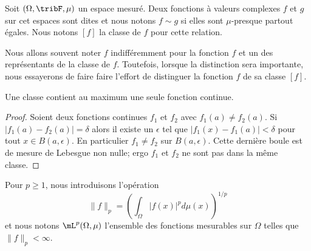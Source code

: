 \begin{definition}      \label{DEFooKMJQooXeaUtp}
	Soit \( (\Omega,\tribF,\mu)\) un espace mesuré. Deux fonctions à valeurs complexes \( f\) et \( g\) sur cet espaces sont dites  et nous notons \( f\sim g\) si elles sont \( \mu\)-presque partout égales. Nous notons \( [f]\) la classe de \( f\) pour cette relation.
\end{definition}

Nous allons souvent noter \( f\) indifféremment pour la fonction \( f\) et un des représentants de la classe de \( f\). Toutefois, lorsque la distinction sera importante, nous essayerons de faire faire l'effort de distinguer la fonction \( f\) de sa classe \( [f]\).

\begin{lemma}
	Une classe contient au maximum une seule fonction continue.
\end{lemma}

\begin{proof}
	Soient deux fonctions continues \( f_1\) et \( f_2\) avec \( f_1(a)\neq f_2(a)\). Si \( | f_1(a)-f_2(a) |=\delta\) alors il existe un \( \epsilon\) tel que \( | f_1(x)-f_1(a) |<\delta\) pour tout \( x\in B(a,\epsilon)\). En particulier \( f_1\neq f_2\) sur \( B(a,\epsilon)\). Cette dernière boule est de mesure de Lebesgue non nulle; ergo \( f_1\) et \( f_2\) ne sont pas dans la même classe.
\end{proof}

\begin{definition}      \label{DEFooTHIDooWYzBtn}
	Pour \( p\geq 1\), nous introduisons l'opération
	\begin{equation}        \label{EQooBDBXooCHRmpo}
		\| f \|_p=\left( \int_{\Omega}| f(x) |^pd\mu(x) \right)^{1/p}
	\end{equation}
	et nous notons \( \mL^p(\Omega,\mu)\) l'ensemble des fonctions mesurables sur \( \Omega\) telles que \( \| f \|_p<\infty\).
\end{definition}

